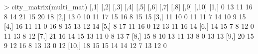 \documentclass[
]{article}
\newenvironment{Shaded}{\begin{snugshade}}{\end{snugshade}}
\newcommand{\DecValTok}[1]{\textcolor[rgb]{0.00,0.00,0.81}{#1}}
\newcommand{\FunctionTok}[1]{\textcolor[rgb]{0.00,0.00,0.00}{#1}}
\newcommand{\NormalTok}[1]{#1}
\newcommand{\SpecialCharTok}[1]{\textcolor[rgb]{0.00,0.00,0.00}{#1}}
\begin{document}
\begin{Shaded}
\begin{Highlighting}[]
\SpecialCharTok{\textgreater{}} \FunctionTok{city\_matrix}\NormalTok{(multi\_mat)}
\NormalTok{      [,}\DecValTok{1}\NormalTok{] [,}\DecValTok{2}\NormalTok{] [,}\DecValTok{3}\NormalTok{] [,}\DecValTok{4}\NormalTok{] [,}\DecValTok{5}\NormalTok{] [,}\DecValTok{6}\NormalTok{] [,}\DecValTok{7}\NormalTok{] [,}\DecValTok{8}\NormalTok{] [,}\DecValTok{9}\NormalTok{] [,}\DecValTok{10}\NormalTok{]}
\NormalTok{ [}\DecValTok{1}\NormalTok{,]    }\DecValTok{0}   \DecValTok{13}   \DecValTok{11}   \DecValTok{16}    \DecValTok{8}   \DecValTok{14}   \DecValTok{21}   \DecValTok{15}   \DecValTok{20}    \DecValTok{18}
\NormalTok{ [}\DecValTok{2}\NormalTok{,]   }\DecValTok{13}    \DecValTok{0}   \DecValTok{10}   \DecValTok{11}   \DecValTok{17}   \DecValTok{15}   \DecValTok{16}    \DecValTok{8}   \DecValTok{15}    \DecValTok{15}
\NormalTok{ [}\DecValTok{3}\NormalTok{,]   }\DecValTok{11}   \DecValTok{10}    \DecValTok{0}   \DecValTok{11}   \DecValTok{11}    \DecValTok{7}   \DecValTok{14}   \DecValTok{10}    \DecValTok{9}    \DecValTok{15}
\NormalTok{ [}\DecValTok{4}\NormalTok{,]   }\DecValTok{16}   \DecValTok{11}   \DecValTok{11}    \DecValTok{0}   \DecValTok{16}    \DecValTok{8}   \DecValTok{15}   \DecValTok{13}   \DecValTok{12}    \DecValTok{14}
\NormalTok{ [}\DecValTok{5}\NormalTok{,]    }\DecValTok{8}   \DecValTok{17}   \DecValTok{11}   \DecValTok{16}    \DecValTok{0}   \DecValTok{12}   \DecValTok{13}   \DecValTok{11}   \DecValTok{16}    \DecValTok{14}
\NormalTok{ [}\DecValTok{6}\NormalTok{,]   }\DecValTok{14}   \DecValTok{15}    \DecValTok{7}    \DecValTok{8}   \DecValTok{12}    \DecValTok{0}   \DecValTok{11}   \DecValTok{13}    \DecValTok{8}    \DecValTok{12}
\NormalTok{ [}\DecValTok{7}\NormalTok{,]   }\DecValTok{21}   \DecValTok{16}   \DecValTok{14}   \DecValTok{15}   \DecValTok{13}   \DecValTok{11}    \DecValTok{0}    \DecValTok{8}   \DecValTok{13}     \DecValTok{7}
\NormalTok{ [}\DecValTok{8}\NormalTok{,]   }\DecValTok{15}    \DecValTok{8}   \DecValTok{10}   \DecValTok{13}   \DecValTok{11}   \DecValTok{13}    \DecValTok{8}    \DecValTok{0}   \DecValTok{13}    \DecValTok{13}
\NormalTok{ [}\DecValTok{9}\NormalTok{,]   }\DecValTok{20}   \DecValTok{15}    \DecValTok{9}   \DecValTok{12}   \DecValTok{16}    \DecValTok{8}   \DecValTok{13}   \DecValTok{13}    \DecValTok{0}    \DecValTok{12}
\NormalTok{[}\DecValTok{10}\NormalTok{,]   }\DecValTok{18}   \DecValTok{15}   \DecValTok{15}   \DecValTok{14}   \DecValTok{14}   \DecValTok{12}    \DecValTok{7}   \DecValTok{13}   \DecValTok{12}     \DecValTok{0}
\end{Highlighting}
\end{Shaded}
\end{document}
